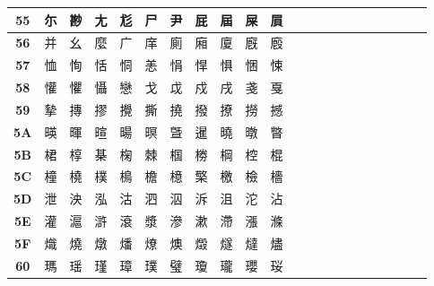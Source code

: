 \begin{table}[H]
\begin{tabular}{|Sc|Sc|Sc|Sc|Sc|Sc|Sc|Sc|Sc|Sc|Sc|}
\textbf{55} & 尓 & 尠 & 尢 & 尨 & 尸 & 尹 & 屁 & 屆 & 屎 & 屓 \\ \hline
\textbf{56} & 并 & 幺 & 麼 & 广 & 庠 & 廁 & 廂 & 廈 & 廐 & 廏 \\ \hline
\textbf{57} & 恤 & 恂 & 恬 & 恫 & 恙 & 悁 & 悍 & 惧 & 悃 & 悚 \\ \hline
\textbf{58} & 懽 & 懼 & 懾 & 戀 & 戈 & 戉 & 戍 & 戌 & 戔 & 戛 \\ \hline
\textbf{59} & 摯 & 摶 & 摎 & 攪 & 撕 & 撓 & 撥 & 撩 & 撈 & 撼 \\ \hline
\textbf{5A} & 暎 & 暉 & 暄 & 暘 & 暝 & 曁 & 暹 & 曉 & 暾 & 暼 \\ \hline
\textbf{5B} & 桾 & 椁 & 棊 & 椈 & 棘 & 椢 & 椦 & 棡 & 椌 & 棍 \\ \hline
\textbf{5C} & 橦 & 橈 & 樸 & 樢 & 檐 & 檍 & 檠 & 檄 & 檢 & 檣 \\ \hline
\textbf{5D} & 泄 & 泱 & 泓 & 沽 & 泗 & 泅 & 泝 & 沮 & 沱 & 沾 \\ \hline
\textbf{5E} & 灌 & 滬 & 滸 & 滾 & 漿 & 滲 & 漱 & 滯 & 漲 & 滌 \\ \hline
\textbf{5F} & 熾 & 燒 & 燉 & 燔 & 燎 & 燠 & 燬 & 燧 & 燵 & 燼 \\ \hline
\textbf{60} & 瑪 & 瑶 & 瑾 & 璋 & 璞 & 璧 & 瓊 & 瓏 & 瓔 & 珱 \\ \hline
\end{tabular}
\end{table}

